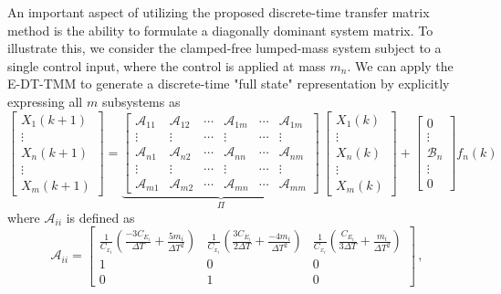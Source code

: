 \documentclass[11pt]{ucthesis}
\newcommand{\beq}{\begin{equation}}
\newcommand{\eeq}{\end{equation}}
\begin{document}
An important aspect of utilizing the proposed discrete-time transfer matrix method is the ability to formulate a diagonally dominant system matrix. To illustrate this, we consider the clamped-free lumped-mass system subject to a single control input, where the control is applied at mass $m_n$. We can apply the E-DT-TMM to generate a discrete-time "full state" representation by explicitly expressing all $m$ subsystems as
\beq		\label{fullS}
\left [
\begin{array}{c}
X_1 (k+1) \\
\vdots \\
X_n (k+1) \\
\vdots \\
X_m (k+1) 
\end{array}
\right ] = \underbrace{\left [
\begin{array}{cccccc}
\mathcal{A}_{11} & \mathcal{A}_{12} & \cdots & \mathcal{A}_{1m} & \cdots & \mathcal{A}_{1m} \\
\vdots & \vdots & \cdots & \vdots &\cdots & \vdots \\
\mathcal{A}_{n1} & \mathcal{A}_{n2} & \cdots & \mathcal{A}_{nn} & \cdots & \mathcal{A}_{nm} \\
\vdots & \vdots & \cdots & \vdots &\cdots & \vdots \\
\mathcal{A}_{m1} & \mathcal{A}_{m2} & \cdots & \mathcal{A}_{mn} & \cdots &\mathcal{A}_{mm}
\end{array}
\right ]}_{\Pi} \,
\left [
\begin{array}{c}
X_1 (k) \\
\vdots \\
X_n (k) \\
\vdots \\
X_m (k) 
\end{array}
\right ] + \left [
\begin{array}{c}
0 \\
\vdots \\
\mathcal{B}_n \\
\vdots \\
0
\end{array}
\right ] f_n (k)
\eeq
where $\mathcal{A}_{ii}$ is defined as
\[
\mathcal{A}_{ii} = \begin{bmatrix}
\frac{1}{C_{x_i}}(\frac{-3C_{E_i}}{\Delta T}+\frac{5m_i}{\Delta T^2})&\frac{1}{C_{x_i}}(\frac{3C_{E_i}}{2\Delta T}+\frac{-4m_i}{\Delta T^2})&\frac{1}{C_{x_i}}(\frac{C_{E_i}}{3\Delta T}+\frac{m_i}{\Delta T^2})\\1&0&0\\0&1&0
\end{bmatrix} \,,
\]
\end{document}
